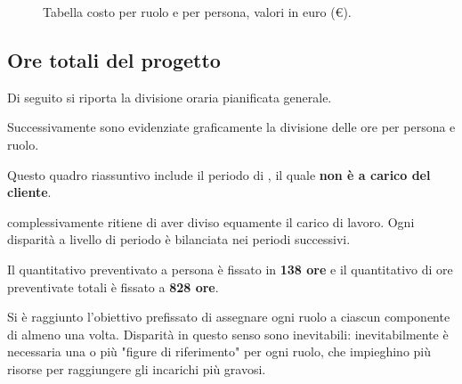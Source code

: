 \begin{figure}[H]
\label{tab:cvv}

  \caption{Tabella costo {\VV} per ruolo e per persona, valori in euro (\euro).}
\end{figure}

\pagebreak[4]

\subsection{Ore totali del progetto}
Di seguito si riporta la divisione oraria pianificata generale.

Successivamente sono evidenziate graficamente la divisione delle ore per persona e ruolo.

Questo quadro riassuntivo include il periodo di {\AR}, il quale \textbf{non è a carico del cliente}.

{\hx} complessivamente ritiene di aver diviso equamente il carico di lavoro. Ogni disparità a livello di periodo è bilanciata nei periodi successivi. 

Il quantitativo preventivato a persona è fissato in \textbf{138 ore} e il quantitativo di ore preventivate totali è fissato a \textbf{828 ore}.

Si è raggiunto l'obiettivo prefissato di assegnare ogni ruolo a ciascun componente di {\hx} almeno una volta. Disparità in questo senso sono inevitabili: inevitabilmente è necessaria una o più "figure di riferimento" per ogni ruolo, che impieghino più risorse per raggiungere gli incarichi più gravosi.


